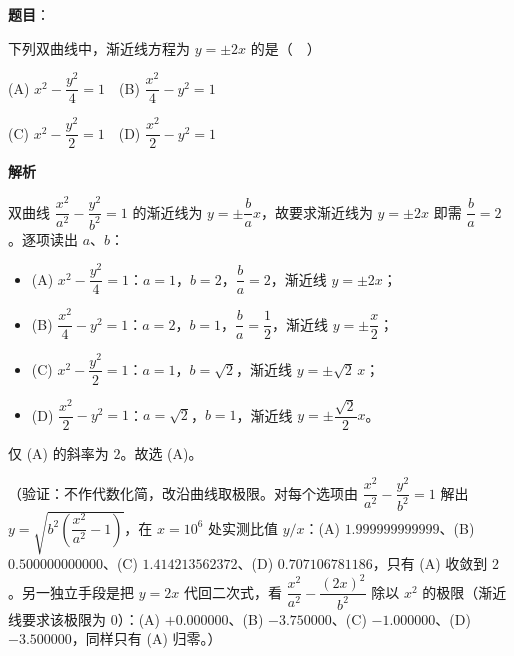 \begin{answer}

\textbf{题目}：

下列双曲线中，渐近线方程为 \(y=\pm 2x\) 的是（　）

(A) \(x^2-\dfrac{y^2}{4}=1\)　(B) \(\dfrac{x^2}{4}-y^2=1\)

(C) \(x^2-\dfrac{y^2}{2}=1\)　(D) \(\dfrac{x^2}{2}-y^2=1\)

\textbf{解析}

双曲线 \(\dfrac{x^2}{a^2}-\dfrac{y^2}{b^2}=1\) 的渐近线为 \(y=\pm\dfrac{b}{a}x\)，故要求渐近线为 \(y=\pm 2x\) 即需 \(\dfrac{b}{a}=2\)。逐项读出 \(a\)、\(b\)：

\begin{itemize}
\item (A) \(x^2-\dfrac{y^2}{4}=1\)：\(a=1\)，\(b=2\)，\(\dfrac{b}{a}=2\)，渐近线 \(y=\pm 2x\)；
\item (B) \(\dfrac{x^2}{4}-y^2=1\)：\(a=2\)，\(b=1\)，\(\dfrac{b}{a}=\dfrac{1}{2}\)，渐近线 \(y=\pm\dfrac{x}{2}\)；
\item (C) \(x^2-\dfrac{y^2}{2}=1\)：\(a=1\)，\(b=\sqrt{2}\)，渐近线 \(y=\pm\sqrt{2}\,x\)；
\item (D) \(\dfrac{x^2}{2}-y^2=1\)：\(a=\sqrt{2}\)，\(b=1\)，渐近线 \(y=\pm\dfrac{\sqrt{2}}{2}x\)。
\end{itemize}

仅 (A) 的斜率为 \(2\)。故选 (A)。

（验证：不作代数化简，改沿曲线取极限。对每个选项由 \(\dfrac{x^2}{a^2}-\dfrac{y^2}{b^2}=1\) 解出 \(y=\sqrt{b^2\left(\dfrac{x^2}{a^2}-1\right)}\)，在 \(x=10^6\) 处实测比值 \(y/x\)：(A) \(1.999999999999\)、(B) \(0.500000000000\)、(C) \(1.414213562372\)、(D) \(0.707106781186\)，只有 (A) 收敛到 \(2\)。另一独立手段是把 \(y=2x\) 代回二次式，看 \(\dfrac{x^2}{a^2}-\dfrac{(2x)^2}{b^2}\) 除以 \(x^2\) 的极限（渐近线要求该极限为 \(0\)）：(A) \(+0.000000\)、(B) \(-3.750000\)、(C) \(-1.000000\)、(D) \(-3.500000\)，同样只有 (A) 归零。）


\end{answer}
